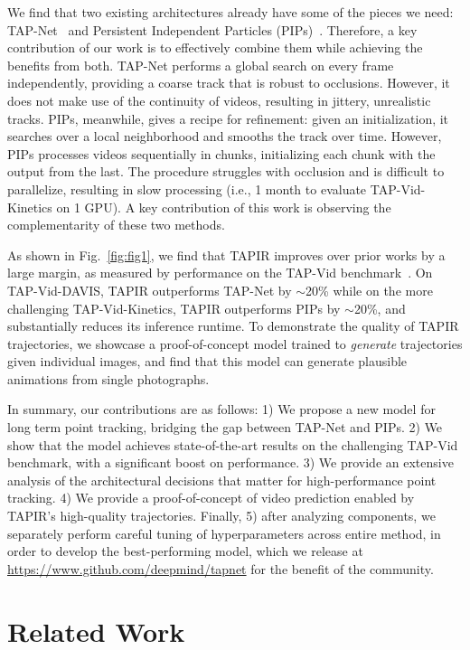 \documentclass[10pt,twocolumn,letterpaper]{article}
\begin{document}
We find that two existing architectures already have some of the pieces we need:  TAP-Net~\cite{doersch2022tap} and Persistent Independent Particles (PIPs)~\cite{harley2022particle}.  Therefore, a key contribution of our work is to effectively combine them while achieving the benefits from both.  TAP-Net  performs a global search on every frame independently, providing a coarse track that is robust to occlusions.  However, it does not make use of the continuity of videos, resulting in jittery, unrealistic tracks.  PIPs, meanwhile, gives a recipe for refinement: given an initialization, it searches over a local neighborhood and smooths the track over time.  However, PIPs processes videos sequentially in chunks, initializing each chunk with the output from the last.  The procedure struggles with occlusion and is difficult to parallelize, resulting in slow processing (i.e., 1 month to evaluate TAP-Vid-Kinetics on 1 GPU).  A key contribution of this work is observing the complementarity of these two methods.  



As shown in Fig.~\ref{fig:fig1}, we find that TAPIR improves over prior works by a large margin, as measured by performance on the TAP-Vid benchmark~\cite{doersch2022tap}.   On TAP-Vid-DAVIS, TAPIR outperforms TAP-Net by $\sim$20\% while on the more challenging TAP-Vid-Kinetics, TAPIR outperforms PIPs by $\sim$20\%, and substantially reduces its inference runtime.  
To demonstrate the quality of TAPIR trajectories, we showcase a proof-of-concept model trained to \emph{generate} trajectories given individual images, and find that this model can generate plausible animations from single photographs.  

In summary, our contributions are as follows: 1) We propose a new model for long term point tracking, bridging the gap between TAP-Net and PIPs. 2) We show that the model achieves state-of-the-art results on the challenging TAP-Vid benchmark, with a significant boost on performance. 3) We provide an extensive analysis of the architectural decisions that matter for high-performance point tracking. 4) We provide a proof-of-concept of video prediction enabled by TAPIR's high-quality trajectories. Finally, 5) after analyzing components, we separately perform careful tuning of hyperparameters across entire method, in order to develop the best-performing model, which we release at \url{https://www.github.com/deepmind/tapnet} for the benefit of the community.


\section{Related Work}
\end{document}
